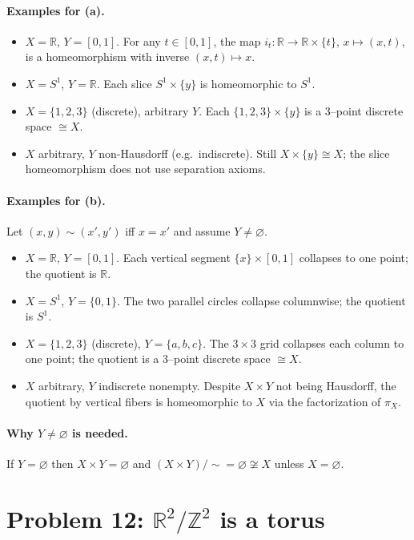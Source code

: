 \documentclass[12pt,a4paper]{article}
\theoremstyle{plain}
\theoremstyle{definition}
\theoremstyle{remark}
\theoremstyle{remark}
\begin{document}
	\paragraph{Examples for (a).}
	\begin{itemize}
		\item $X=\mathbb{R}$, $Y=[0,1]$. For any $t\in[0,1]$, the map
		$i_t:\mathbb{R}\to \mathbb{R}\times\{t\}$, $x\mapsto(x,t)$,
		is a homeomorphism with inverse $(x,t)\mapsto x$.
		\item $X=S^1$, $Y=\mathbb{R}$. Each slice $S^1\times\{y\}$ is homeomorphic to $S^1$.
		\item $X=\{1,2,3\}$ (discrete), arbitrary $Y$. Each $\{1,2,3\}\times\{y\}$ is a 3--point discrete space $\cong X$.
		\item $X$ arbitrary, $Y$ non-Hausdorff (e.g.\ indiscrete). Still $X\times\{y\}\cong X$; the slice homeomorphism does not use separation axioms.
	\end{itemize}
	
	\paragraph{Examples for (b).}
	Let $(x,y)\sim(x',y')$ iff $x=x'$ and assume $Y\neq\varnothing$.
	\begin{itemize}
		\item $X=\mathbb{R}$, $Y=[0,1]$. Each vertical segment $\{x\}\times[0,1]$ collapses to one point; the quotient is $\mathbb{R}$.
		\item $X=S^1$, $Y=\{0,1\}$. The two parallel circles collapse columnwise; the quotient is $S^1$.
		\item $X=\{1,2,3\}$ (discrete), $Y=\{a,b,c\}$. The $3\times3$ grid collapses each column to one point; the quotient is a 3--point discrete space $\cong X$.
		\item $X$ arbitrary, $Y$ indiscrete nonempty. Despite $X\times Y$ not being Hausdorff, the quotient by vertical fibers is homeomorphic to $X$ via the factorization of $\pi_X$.
	\end{itemize}
	
	\paragraph{Why $Y\neq\varnothing$ is needed.}
	If $Y=\varnothing$ then $X\times Y=\varnothing$ and $(X\times Y)/\!\sim=\varnothing\not\cong X$ unless $X=\varnothing$.
	
	\section*{Problem 12: $\mathbb{R}^2/\mathbb{Z}^2$ is a torus}
	
\end{document}
